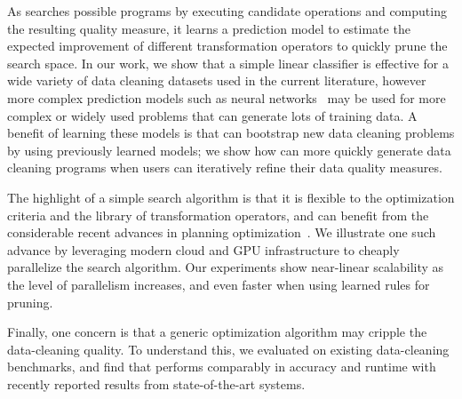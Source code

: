 As \sys searches possible programs by executing candidate operations and computing the resulting quality measure, it learns a prediction model to estimate the expected improvement of different transformation operators to quickly prune the search space.  In our work, we show that a simple linear classifier is effective for a wide variety of data cleaning datasets used in the current literature, however more complex prediction models such as neural networks~\cite{} may be used for more complex or widely used problems that can generate lots of training data.   A benefit of learning these models is that \sys can bootstrap new data cleaning problems by using previously learned models; we show how \sys can more quickly generate data cleaning programs when users can iteratively refine their data quality measures.

The highlight of a simple search algorithm is that it is flexible to the optimization criteria and the library of transformation operators, and can benefit from the considerable recent advances in planning optimization~\cite{silver2016mastering}. We illustrate one such advance by leveraging modern cloud and GPU infrastructure to cheaply parallelize the search algorithm.  Our experiments show near-linear scalability as the level of parallelism increases, and even faster when using learned rules for pruning.

Finally, one concern is that a generic optimization algorithm may cripple the data-cleaning quality.  To understand this, we evaluated \sys on  existing data-cleaning benchmarks, and find that \sys performs comparably in accuracy and runtime with recently reported results from state-of-the-art systems.  






